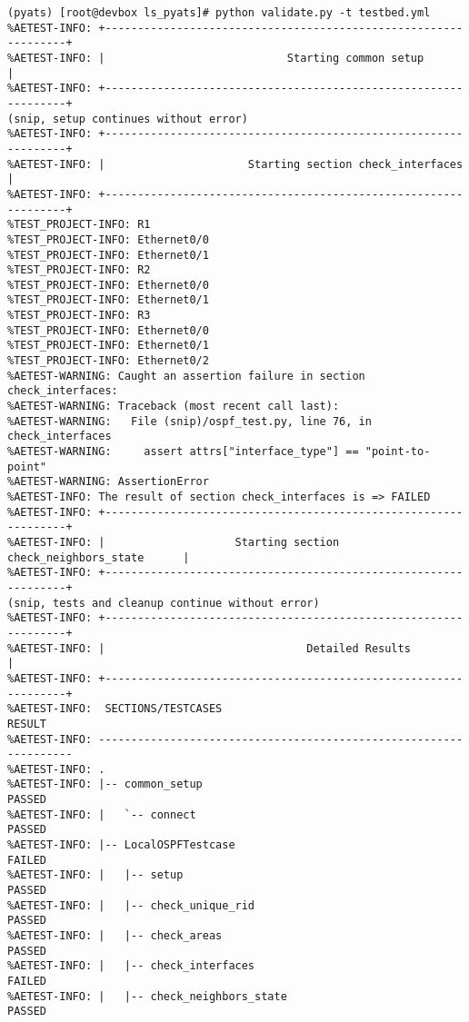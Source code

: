 \begin{verbatim}
(pyats) [root@devbox ls_pyats]# python validate.py -t testbed.yml
%AETEST-INFO: +----------------------------------------------------------------+
%AETEST-INFO: |                            Starting common setup               |
%AETEST-INFO: +----------------------------------------------------------------+
(snip, setup continues without error)
%AETEST-INFO: +----------------------------------------------------------------+
%AETEST-INFO: |                      Starting section check_interfaces         |
%AETEST-INFO: +----------------------------------------------------------------+
%TEST_PROJECT-INFO: R1
%TEST_PROJECT-INFO: Ethernet0/0
%TEST_PROJECT-INFO: Ethernet0/1
%TEST_PROJECT-INFO: R2
%TEST_PROJECT-INFO: Ethernet0/0
%TEST_PROJECT-INFO: Ethernet0/1
%TEST_PROJECT-INFO: R3
%TEST_PROJECT-INFO: Ethernet0/0
%TEST_PROJECT-INFO: Ethernet0/1
%TEST_PROJECT-INFO: Ethernet0/2
%AETEST-WARNING: Caught an assertion failure in section check_interfaces:
%AETEST-WARNING: Traceback (most recent call last):
%AETEST-WARNING:   File (snip)/ospf_test.py, line 76, in check_interfaces
%AETEST-WARNING:     assert attrs["interface_type"] == "point-to-point"
%AETEST-WARNING: AssertionError
%AETEST-INFO: The result of section check_interfaces is => FAILED
%AETEST-INFO: +----------------------------------------------------------------+
%AETEST-INFO: |                    Starting section check_neighbors_state      |
%AETEST-INFO: +----------------------------------------------------------------+
(snip, tests and cleanup continue without error)
%AETEST-INFO: +----------------------------------------------------------------+
%AETEST-INFO: |                               Detailed Results                 |
%AETEST-INFO: +----------------------------------------------------------------+
%AETEST-INFO:  SECTIONS/TESTCASES                                        RESULT
%AETEST-INFO: ------------------------------------------------------------------
%AETEST-INFO: .
%AETEST-INFO: |-- common_setup                                            PASSED
%AETEST-INFO: |   `-- connect                                             PASSED
%AETEST-INFO: |-- LocalOSPFTestcase                                       FAILED
%AETEST-INFO: |   |-- setup                                               PASSED
%AETEST-INFO: |   |-- check_unique_rid                                    PASSED
%AETEST-INFO: |   |-- check_areas                                         PASSED
%AETEST-INFO: |   |-- check_interfaces                                    FAILED
%AETEST-INFO: |   |-- check_neighbors_state                               PASSED

\end{verbatim}
